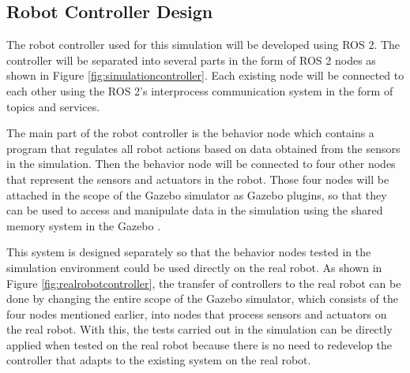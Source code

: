 \subsection{Robot Controller Design}
\label{subsec:controllerdesign}



The robot controller used for this simulation will be developed using ROS 2.
The controller will be separated into several parts in the form of ROS 2 nodes as shown in Figure \ref{fig:simulationcontroller}.
Each existing node will be connected to each other using the ROS 2's interprocess communication system in the form of topics and services.

The main part of the robot controller is the behavior node which contains a program that regulates all robot actions based on data obtained from the sensors in the simulation.
Then the behavior node will be connected to four other nodes that represent the sensors and actuators in the robot.
Those four nodes will be attached in the scope of the Gazebo simulator as Gazebo plugins,
  so that they can be used to access and manipulate data in the simulation using the shared memory system in the Gazebo \citep{gazeboplugins}.



This system is designed separately so that the behavior nodes tested in the simulation environment could be used directly on the real robot.
As shown in Figure \ref{fig:realrobotcontroller},
  the transfer of controllers to the real robot can be done by changing the entire scope of the Gazebo simulator,
  which consists of the four nodes mentioned earlier,
  into nodes that process sensors and actuators on the real robot.
With this, the tests carried out in the simulation can be directly applied when tested on the real robot because there is no need to redevelop the controller that adapts to the existing system on the real robot.
